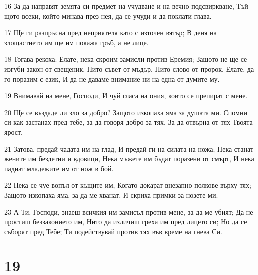 \par 16 За да направят земята си предмет на учудване и на вечно подсвиркване, Тъй щото всеки, който минава през нея, да се учуди и да поклати глава.
\par 17 Ще ги разпръсна пред неприятеля като с източен вятър; В деня на злощастието им ще им покажа гръб, а не лице.
\par 18 Тогава рекоха: Елате, нека скроим замисли против Еремия; Защото не ще се изгуби закон от свещеник, Нито съвет от мъдър, Нито слово от пророк. Елате, да го поразим с език, И да не даваме внимание ни на една от думите му.
\par 19 Внимавай на мене, Господи, И чуй гласа на ония, които се препират с мене.
\par 20 Ще се въздаде ли зло за добро? Защото изкопаха яма за душата ми. Спомни си как застанах пред тебе, за да говоря добро за тях, За да отвърна от тях Твоята ярост.
\par 21 Затова, предай чадата им на глад, И предай ги на силата на ножа; Нека станат жените им бездетни и вдовици, Нека мъжете им бъдат поразени от смърт, И нека паднат младежите им от нож в бой.
\par 22 Нека се чуе вопъл от къщите им, Когато докарат внезапно полкове върху тях; Защото изкопаха яма, за да ме хванат, И скриха примки за нозете ми.
\par 23 А Ти, Господи, знаеш всичкия им замисъл против мене, за да ме убият; Да не простиш беззаконието им, Нито да изличиш греха им пред лицето си; Но да се съборят пред Тебе; Ти подействувай против тях във време на гнева Си.

\chapter{19}

